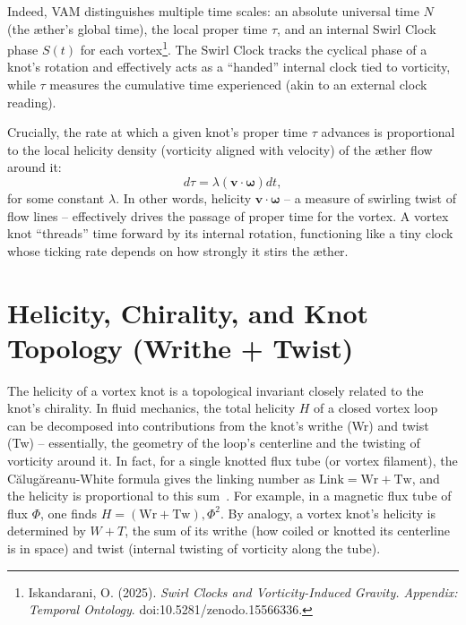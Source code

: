 \documentclass[11pt]{article}
\begin{document}
Indeed, VAM distinguishes multiple time scales: an absolute universal time $N$ (the \ae ther's global time), the local proper time $\tau$, and an internal Swirl Clock phase $S(t)$ for each vortex\footnote{Iskandarani, O. (2025). \textit{Swirl Clocks and Vorticity-Induced Gravity. Appendix: Temporal Ontology}. doi:10.5281/zenodo.15566336.}. The Swirl Clock tracks the cyclical phase of a knot's rotation and effectively acts as a ``handed'' internal clock tied to vorticity, while $\tau$ measures the cumulative time experienced (akin to an external clock reading).

Crucially, the rate at which a given knot's proper time $\tau$ advances is proportional to the local helicity density (vorticity aligned with velocity) of the \ae ther flow around it:
\begin{equation}
d\tau = \lambda (\mathbf{v}\cdot\boldsymbol{\omega}) dt,
\label{eq:helicity-time}
\end{equation}
for some constant $\lambda$. In other words, helicity $\mathbf{v}\cdot\boldsymbol{\omega}$ -- a measure of swirling twist of flow lines -- effectively drives the passage of proper time for the vortex. A vortex knot ``threads'' time forward by its internal rotation, functioning like a tiny clock whose ticking rate depends on how strongly it stirs the \ae ther.

\usepackage[utf8]{inputenc}
\usepackage[T1]{fontenc}
\section*{Helicity, Chirality, and Knot Topology (Writhe + Twist)}

The helicity of a vortex knot is a topological invariant closely related to the knot's chirality. In fluid mechanics, the total helicity $H$ of a closed vortex loop can be decomposed into contributions from the knot's writhe (Wr) and twist (Tw) -- essentially, the geometry of the loop's centerline and the twisting of vorticity around it. In fact, for a single knotted flux tube (or vortex filament), the Călugăreanu-White formula gives the linking number as $\text{Link} = \text{Wr} + \text{Tw}$, and the helicity is proportional to this sum~\cite{knot_theroy_in_fluid}. For example, in a magnetic flux tube of flux $\Phi$, one finds $H = (\text{Wr} + \text{Tw}),\Phi^2$\cite{knot_theroy_in_fluid}. By analogy, a vortex knot's helicity is determined by $W+T$, the sum of its writhe (how coiled or knotted its centerline is in space) and twist (internal twisting of vorticity along the tube)\cite{knot_theroy_in_fluid}.
\end{document}
